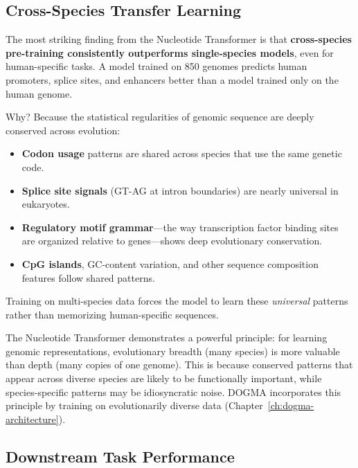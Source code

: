 \subsection{Cross-Species Transfer Learning}

The most striking finding from the Nucleotide Transformer is that \textbf{cross-species pre-training consistently outperforms single-species models}, even for human-specific tasks. A model trained on 850 genomes predicts human promoters, splice sites, and enhancers better than a model trained only on the human genome.

Why? Because the statistical regularities of genomic sequence are deeply conserved across evolution:
\begin{itemize}[leftmargin=1.5em]
  \item \textbf{Codon usage} patterns are shared across species that use the same genetic code.
  \item \textbf{Splice site signals} (GT-AG at intron boundaries) are nearly universal in eukaryotes.
  \item \textbf{Regulatory motif grammar}---the way transcription factor binding sites are organized relative to genes---shows deep evolutionary conservation.
  \item \textbf{CpG islands}, GC-content variation, and other sequence composition features follow shared patterns.
\end{itemize}

Training on multi-species data forces the model to learn these \emph{universal} patterns rather than memorizing human-specific sequences.

\begin{keyinsight}
The Nucleotide Transformer demonstrates a powerful principle: for learning genomic representations, evolutionary breadth (many species) is more valuable than depth (many copies of one genome). This is because conserved patterns that appear across diverse species are likely to be functionally important, while species-specific patterns may be idiosyncratic noise. DOGMA incorporates this principle by training on evolutionarily diverse data (Chapter~\ref{ch:dogma-architecture}).
\end{keyinsight}

\subsection{Downstream Task Performance}

